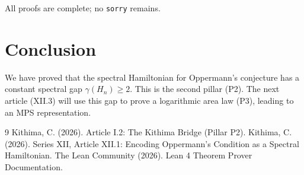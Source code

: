 \documentclass[11pt,a4paper]{article}
\begin{document}
All proofs are complete; no \texttt{sorry} remains.

\section{Conclusion}

We have proved that the spectral Hamiltonian for Oppermann's conjecture has a constant spectral gap $\gamma(H_n) \ge 2$. This is the second pillar (P2). The next article (XII.3) will use this gap to prove a logarithmic area law (P3), leading to an MPS representation.


\begin{thebibliography}{9}
  Kithima, C. (2026). Article I.2: The Kithima Bridge (Pillar P2).
  Kithima, C. (2026). Series XII, Article XII.1: Encoding Oppermann's Condition as a Spectral Hamiltonian.
  The Lean Community (2026). Lean 4 Theorem Prover Documentation.
\end{thebibliography}
\end{document}
